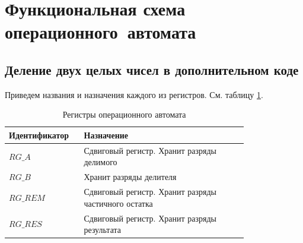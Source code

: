 \documentclass[a4paper,14pt]{extarticle}
\begin{document}
\fi


\section{Функциональная схема\\операционного~автомата}
\subsection{Деление двух целых чисел в дополнительном коде}

Приведем названия и назначения каждого из регистров. См. таблицу \ref{tab:course_op1_regs}.
\begin{table}[h!]
	\centering
	\small
	\begin{tabular}{|m{0.2\linewidth}|m{0.6\linewidth}|}
		\hline
		\textbf{Идентификатор} & \textbf{Назначение} \\ \hline
		$RG\_A$ & Сдвиговый регистр. Хранит разряды делимого \\ \hline
		$RG\_B$ & Хранит разряды делителя \\ \hline
		$RG\_REM$ & Сдвиговый регистр. Хранит разряды частичного остатка \\ \hline
		$RG\_RES$ & Сдвиговый регистр. Хранит разряды результата \\ \hline
	\end{tabular}
	\caption{Регистры операционного автомата}
	\label{tab:course_op1_regs}
\end{table}
\end{document}
